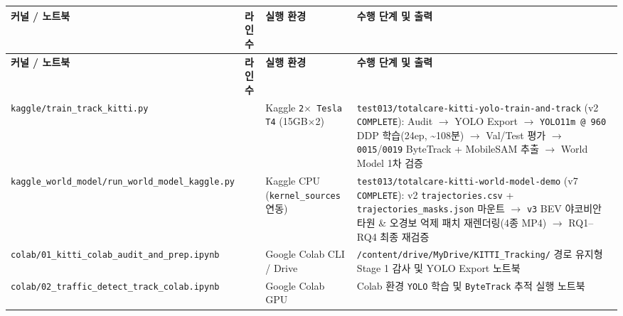 \documentclass[10.5pt,a4paper]{article}
\begin{document}
\begin{footnotesize}
\setlength{\tabcolsep}{4pt}
\setlength{\LTleft}{0pt}\setlength{\LTright}{0pt}
\begin{longtable}{>{\raggedright\arraybackslash}p{} >{\raggedright\arraybackslash}p{} >{\raggedright\arraybackslash}p{} >{\raggedright\arraybackslash}p{}}
\toprule
\textbf{커널 / 노트북} & \textbf{라인 수} & \textbf{실행 환경} & \textbf{수행 단계 및 출력} \\
\midrule
\endfirsthead
\toprule
\textbf{커널 / 노트북} & \textbf{라인 수} & \textbf{실행 환경} & \textbf{수행 단계 및 출력} \\
\midrule
\endhead
\bottomrule
\endfoot
\texttt{kaggle/\allowbreak{}train\_\allowbreak{}track\_\allowbreak{}kitti.\allowbreak{}py} & 342 & Kaggle \texttt{2$\times$ Tesla T4} (15GB$\times$2) & \texttt{test013/\allowbreak{}totalcare-\allowbreak{}kitti-\allowbreak{}yolo-\allowbreak{}train-\allowbreak{}and-\allowbreak{}track} (v2 \texttt{COMPLETE}): Audit $\rightarrow$ YOLO Export $\rightarrow$ \texttt{YOLO11m @ 960} DDP 학습(24ep, \textasciitilde{}108분) $\rightarrow$ Val/Test 평가 $\rightarrow$ \texttt{0015}/\texttt{0019} ByteTrack + MobileSAM 추출 $\rightarrow$ World Model 1차 검증 \\
\texttt{kaggle\_\allowbreak{}world\_\allowbreak{}model/\allowbreak{}run\_\allowbreak{}world\_\allowbreak{}model\_\allowbreak{}kaggle.\allowbreak{}py} & 205 & Kaggle CPU (\texttt{kernel\_\allowbreak{}sources} 연동) & \texttt{test013/\allowbreak{}totalcare-\allowbreak{}kitti-\allowbreak{}world-\allowbreak{}model-\allowbreak{}demo} (v7 \texttt{COMPLETE}): v2 \texttt{trajectories.\allowbreak{}csv} + \texttt{trajectories\_\allowbreak{}masks.\allowbreak{}json} 마운트 $\rightarrow$ \texttt{v3} BEV 야코비안 타원 \& 오경보 억제 패치 재렌더링(4종 MP4) $\rightarrow$ RQ1--RQ4 최종 재검증 \\
\texttt{colab/\allowbreak{}01\_\allowbreak{}kitti\_\allowbreak{}colab\_\allowbreak{}audit\_\allowbreak{}and\_\allowbreak{}prep.\allowbreak{}ipynb} & 139 & Google Colab CLI / Drive & \texttt{/\allowbreak{}content/\allowbreak{}drive/\allowbreak{}MyDrive/\allowbreak{}KITTI\_\allowbreak{}Tracking/\allowbreak{}} 경로 유지형 Stage 1 감사 및 YOLO Export 노트북 \\
\texttt{colab/\allowbreak{}02\_\allowbreak{}traffic\_\allowbreak{}detect\_\allowbreak{}track\_\allowbreak{}colab.\allowbreak{}ipynb} & 112 & Google Colab GPU & Colab 환경 \texttt{YOLO} 학습 및 \texttt{ByteTrack} 추적 실행 노트북 \\
\end{longtable}
\end{footnotesize}
\end{document}
